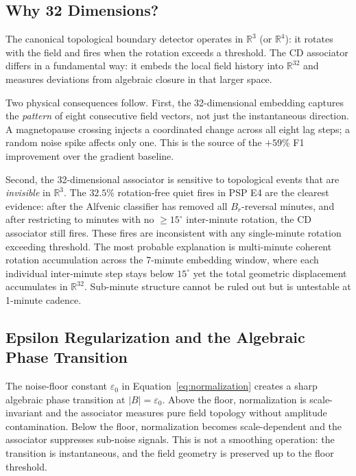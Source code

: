 \documentclass[draft]{agujournal2025}
\newcommand{\eps}{\varepsilon}
\begin{document}
\subsection{Why 32 Dimensions?}

The canonical topological boundary detector operates in $\mathbb{R}^3$ (or
$\mathbb{R}^4$): it rotates with the field and fires when the rotation exceeds
a threshold.  The CD associator differs in a fundamental way: it embeds the
local field history into $\mathbb{R}^{32}$ and measures deviations from
algebraic closure in that larger space.

Two physical consequences follow.  First, the 32-dimensional embedding captures
the \emph{pattern} of eight consecutive field vectors, not just the instantaneous
direction.  A magnetopause crossing injects a coordinated change across all eight
lag steps; a random noise spike affects only one.  This is the source of the
$+59\%$ F1 improvement over the gradient baseline.

Second, the 32-dimensional associator is sensitive to topological events that
are \emph{invisible} in $\mathbb{R}^3$.  The $32.5\%$ rotation-free quiet fires
in PSP E4 are the clearest evidence: after the Alfvenic classifier has removed
all $B_r$-reversal minutes, and after restricting to minutes with no
$\geq 15^\circ$ inter-minute rotation, the CD associator still fires.
These fires are inconsistent with any single-minute rotation exceeding threshold.
The most probable explanation is multi-minute coherent rotation accumulation
across the 7-minute embedding window, where each individual inter-minute step
stays below $15^\circ$ yet the total geometric displacement accumulates in
$\mathbb{R}^{32}$.  Sub-minute structure cannot be ruled out but is untestable
at 1-minute cadence.

\subsection{Epsilon Regularization and the Algebraic Phase Transition}

The noise-floor constant $\eps_0$ in Equation~\ref{eq:normalization} creates
a sharp algebraic phase transition at $|B| = \eps_0$.  Above the floor,
normalization is scale-invariant and the associator measures pure field topology
without amplitude contamination.  Below the floor, normalization becomes
scale-dependent and the associator suppresses sub-noise signals.
This is not a smoothing operation: the transition is instantaneous, and the
field geometry is preserved up to the floor threshold.
\end{document}
